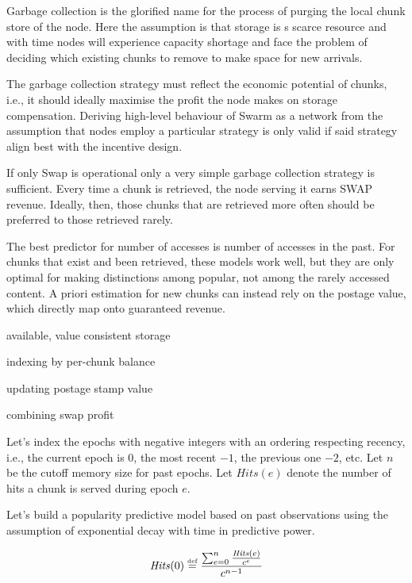 Garbage collection is the glorified name for the process of purging the local chunk store of the node. 
Here the assumption is that storage is s scarce resource and with time nodes will experience capacity shortage and face the problem  of deciding which   existing chunks to remove to make space for new arrivals. 

The garbage collection strategy must reflect the economic potential of chunks, i.e., it should ideally maximise the profit the node makes on storage compensation. Deriving high-level behaviour of Swarm as a network from the assumption that nodes employ a particular strategy is only valid if said strategy align best with the incentive design.

If only Swap is operational only a very simple garbage collection strategy is sufficient. Every time a chunk is retrieved, the node serving it earns SWAP revenue. Ideally, then, those chunks that are retrieved more often should be preferred to those retrieved rarely.

The best predictor for number of accesses is number of accesses in the past. For chunks that exist and been retrieved, these models work well, but they are only optimal for making distinctions among popular, not among the rarely accessed content. A priori estimation for new chunks can instead rely on the postage value, which directly  map onto guaranteed revenue.  


available, value consistent storage

indexing by per-chunk balance

updating postage stamp value 

combining swap profit 

Let's  index  the epochs with negative integers with an ordering respecting recency, i.e., the current epoch is 0, the most recent $-1$, the previous one $-2$, etc. 
Let $n$ be the cutoff memory size for past epochs.
Let $\mathit{Hits}(e)$ denote the number of hits a chunk is served during epoch $e$. 

Let's build a popularity predictive model based on past observations using the assumption of exponential decay with time in predictive power. 

\begin{equation}
    \mathit{Hits}(0) \overset{\textrm{\tiny def}}{=} \frac{\sum_{e=0}^n \frac{\mathit{Hits}(e)}{c^e}}{c^{n-1}}
\end{equation}